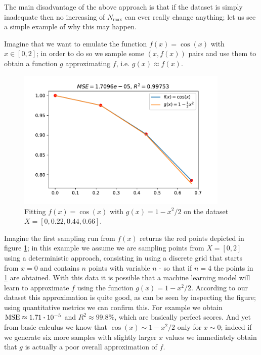 The main disadvantage of the above approach is that if the dataset is simply inadequate then no increasing of $N_{\text{max}}$ can ever really change anything; let us see a simple example of why this may happen.

Imagine that we want to emulate the function $f(x) = \cos(x)$ with $x\in [0, 2]$; in order to do so we sample some $(x, f(x))$ pairs and use them to obtain a function $g$ approximating $f$, i.e. $g(x) \approx f(x)$.
\begin{figure}[H]
    \centering
    \includegraphics[width=0.9\textwidth]{img/pochi_dati.pdf}
    \caption{Fitting $f(x)=\cos(x)$ with $g(x) = 1-x^2/2$ on the dataset $X = [0, 0.22, 0.44, 0.66].$}
    \label{fig:pochi_dati}
\end{figure}
Imagine the first sampling run from $f(x)$ returns the red points depicted in figure \ref{fig:pochi_dati}; in this example we assume we are sampling points from $X = [0, 2]$ using a deterministic approach, consisting in using a discrete grid that starts from $x = 0$ and contains $n$ points with variable $n$ - so that if $n=4$ the points in \ref{fig:pochi_dati} are obtained. 
With this data it is possible that a machine learning model will learn to approximate $f$ using the function $g(x) = 1 - x^2/2$. According to our dataset this approximation is quite good, as can be seen by inspecting the figure; using quantitative metrics we can confirm this. For example we obtain $\text{MSE} \approx 1.71\vdot 10^{-5}$ and $R^2\approx 99.8\%$, which are basically perfect scores. And yet from basic calculus we know that $\cos(x) \sim 1-x^2/2$ only for $x\sim 0$; indeed if we generate six more samples with slightly larger $x$ values we immediately obtain that $g$ is actually a poor overall approximation of $f$.
